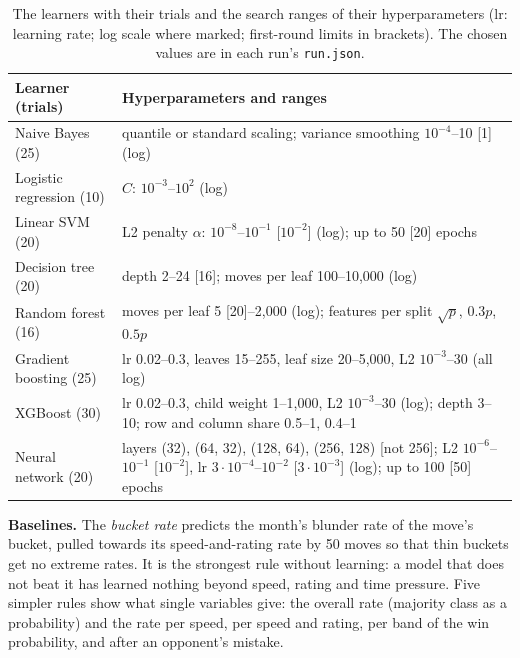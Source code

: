\documentclass[a4paper,oneside,bibliography=totoc]{scrbook}
\begin{document}
\begin{table}[b] %
  \centering\footnotesize
  \caption{The learners with their trials and the search ranges of their hyperparameters (lr: learning rate; log
    scale where marked; first-round limits in brackets). The chosen values are in each run's \texttt{run.json}.}
  \label{tab:methods}
  \begin{tabularx}{\textwidth}{@{}lX@{}}
    \toprule
    Learner (trials) & Hyperparameters and ranges \\
    \midrule
    Naive Bayes (25) & quantile or standard scaling; variance smoothing $10^{-4}$--10 [1] (log) \\
    Logistic regression (10) & $C$: $10^{-3}$--$10^{2}$ (log) \\
    Linear SVM (20) & L2 penalty $\alpha$: $10^{-8}$--$10^{-1}$ [$10^{-2}$] (log); up to 50 [20] epochs \\
    Decision tree (20) & depth 2--24 [16]; moves per leaf 100--10,000 (log) \\
    Random forest (16) & moves per leaf 5 [20]--2,000 (log); features per split $\sqrt{p}$, $0.3p$, $0.5p$ \\
    Gradient boosting (25) & lr 0.02--0.3, leaves 15--255, leaf size 20--5,000, L2 $10^{-3}$--30 (all log) \\
    XGBoost (30) & lr 0.02--0.3, child weight 1--1,000, L2 $10^{-3}$--30 (log); depth 3--10; row and column
      share 0.5--1, 0.4--1 \\
    Neural network (20) & layers (32), (64, 32), (128, 64), (256, 128) [not 256]; L2 $10^{-6}$--$10^{-1}$
      [$10^{-2}$], lr $3\cdot10^{-4}$--$10^{-2}$ [$3\cdot10^{-3}$] (log); up to 100 [50] epochs \\
    \bottomrule
  \end{tabularx}
\end{table}

\textbf{Baselines.} The \emph{bucket rate} predicts the month's blunder rate of the move's bucket, pulled towards
its speed-and-rating rate by 50 moves so that thin buckets get no extreme rates. It is the strongest rule without
learning: a model that does not beat it has learned nothing beyond speed, rating and time pressure. Five simpler
rules show what single variables give: the overall rate (majority class as a probability) and the
rate per speed, per speed and rating, per band of the win probability, and after an opponent's mistake.
\end{document}
